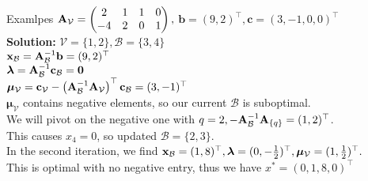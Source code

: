 \documentclass[11pt,compress,t,notes=noshow, xcolor=table]{beamer}
\begin{document}
\begin{vbframe}{Examlpes}
$\mathbf{A}_{\mathcal{V}} =
\begin{pmatrix}
2 & 1 & 1 & 0 \\
-4 & 2 & 0 & 1
\end{pmatrix},$
$\mathbf{b} = (9, 2)^\top, \mathbf{c} = (3, -1, 0, 0)^\top$\\
\lz
\textbf{Solution:}
$\mathcal{V}=\{1,2\}, \mathcal{B}=\{3, 4\}$\\
$\mathbf{x}_{\mathcal{B}} = \mathbf{A}_{\mathcal{B}}^{-1}\mathbf{b} = (9, 2)^\top$\\
$\bm{\lambda} =  \mathbf{A}_{\mathcal{B}}^{-1}\mathbf{c}_{\mathcal{B}} = \mathbf{0}$\\
$\bm{\mu}_{\mathcal{V}} = \mathbf{c}_{\mathcal{V}} - \left( \mathbf{A}_{\mathcal{B}}^{-1} \mathbf{A}_{\mathcal{V}} \right)^\top \mathbf{c}_{\mathcal{B}} = (3, -1)^\top$\\
$\bm{\mu}_{\mathcal{V}}$ contains negative elements, so our current $\mathcal{B}$ is suboptimal.\\
We will pivot on the negative one with $q=2, - \mathbf{A}_{\mathcal{B}}^{-1} \mathbf{A}_{\{q\}}=(1,2)^\top$.\\
This causes $x_4 = 0$, so updated $\mathcal{B}=\{2, 3\}$.\\
In the second iteration, we find $\mathbf{x}_{\mathcal{B}}=(1,8)^\top, \bm{\lambda} = (0, -\frac{1}{2})^\top, \bm{\mu}_{\mathcal{V}} = (1, \frac{1}{2})^\top.$\\
This is optimal with no negative entry, thus we have $x^*=(0,1,8,0)^\top$
\end{vbframe}

\endlecture
\end{document}
